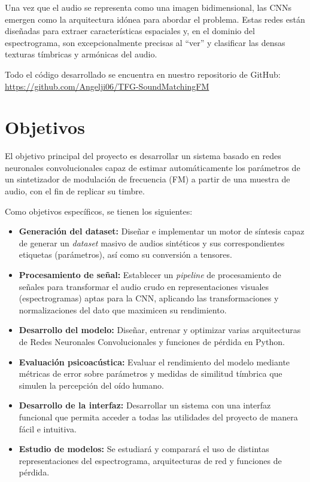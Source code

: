 Una vez que el audio se representa como una imagen bidimensional, las CNNs emergen como la arquitectura idónea para abordar el problema. Estas redes están diseñadas para extraer características espaciales y, en el dominio del espectrograma, son excepcionalmente precisas al ``ver'' y clasificar las densas texturas tímbricas y armónicas del audio. 

Todo el código desarrollado se encuentra en nuestro repositorio de GitHub: \\ 
\url{https://github.com/Angelji06/TFG-SoundMatchingFM}

\section{Objetivos}
\label{sec:objetivos}


El objetivo principal del proyecto es desarrollar un sistema basado en redes neuronales convolucionales capaz de estimar automáticamente los parámetros de un sintetizador de modulación de frecuencia (FM) a partir de una muestra de audio, con el fin de replicar su timbre.  

Como objetivos específicos, se tienen los siguientes:

\begin{itemize}
    \item \textbf{Generación del dataset:} Diseñar e implementar un motor de síntesis capaz de generar un \textit{dataset} masivo de audios sintéticos y sus correspondientes etiquetas (parámetros), así como su conversión a tensores.
    \item \textbf{Procesamiento de señal:} Establecer un \textit{pipeline} de procesamiento de señales para transformar el audio crudo en representaciones visuales (espectrogramas) aptas para la CNN, aplicando las transformaciones y normalizaciones del dato que maximicen su rendimiento.
    \item \textbf{Desarrollo del modelo:} Diseñar, entrenar y optimizar varias arquitecturas de Redes Neuronales Convolucionales y funciones de pérdida en Python.
    \item \textbf{Evaluación psicoacústica:} Evaluar el rendimiento del modelo mediante métricas de error sobre parámetros y medidas de similitud tímbrica que simulen la percepción del oído humano.
    \item \textbf{Desarrollo de la interfaz:} Desarrollar un sistema con una interfaz funcional que permita acceder a todas las utilidades del proyecto de manera fácil e intuitiva.
    \item \textbf{Estudio de modelos:} Se estudiará y comparará el uso de distintas representaciones del espectrograma, arquitecturas de red y funciones de pérdida.
\end{itemize}

